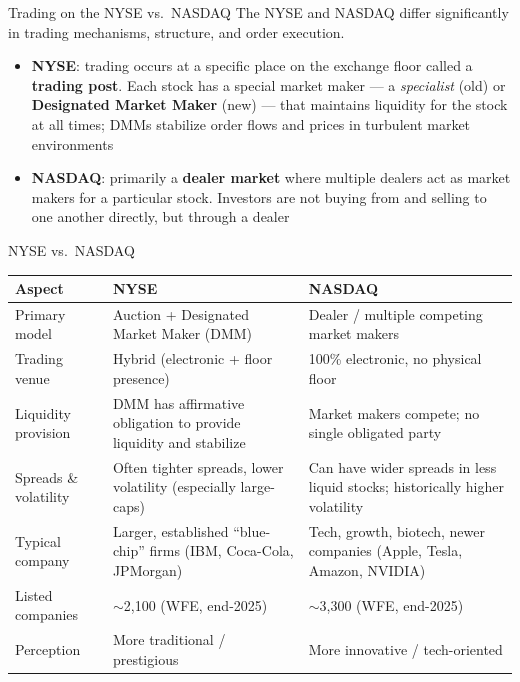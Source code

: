 \documentclass[aspectratio=169]{beamer}
\begin{document}
\begin{frame}{Trading on the NYSE vs.\ NASDAQ}
The NYSE and NASDAQ differ significantly in trading mechanisms, structure, and order execution.
\begin{itemize}
  \item \textbf{NYSE}: trading occurs at a specific place on the exchange floor called a \textbf{trading post}. Each stock has a special market maker --- a \emph{specialist} (old) or \textbf{Designated Market Maker} (new) --- that maintains liquidity for the stock at all times; DMMs stabilize order flows and prices in turbulent market environments
  \item \textbf{NASDAQ}: primarily a \textbf{dealer market} where multiple dealers act as market makers for a particular stock. Investors are not buying from and selling to one another directly, but through a dealer
\end{itemize}
\end{frame}

\begin{frame}{NYSE vs.\ NASDAQ}
\begin{table}
\centering
\footnotesize
\begin{tabular}{p{}p{}p{}}
\toprule
\textbf{Aspect} & \textbf{NYSE} & \textbf{NASDAQ} \\
\midrule
Primary model & Auction + Designated Market Maker (DMM) & Dealer / multiple competing market makers \\
Trading venue & Hybrid (electronic + floor presence) & 100\% electronic, no physical floor \\
Liquidity provision & DMM has affirmative obligation to provide liquidity and stabilize & Market makers compete; no single obligated party \\
Spreads \& volatility & Often tighter spreads, lower volatility (especially large-caps) & Can have wider spreads in less liquid stocks; historically higher volatility \\
Typical company & Larger, established ``blue-chip'' firms (IBM, Coca-Cola, JPMorgan) & Tech, growth, biotech, newer companies (Apple, Tesla, Amazon, NVIDIA) \\
Listed companies & $\sim$2,100 (WFE, end-2025) & $\sim$3,300 (WFE, end-2025) \\
Perception & More traditional / prestigious & More innovative / tech-oriented \\
\bottomrule
\end{tabular}
\end{table}
\end{frame}
\end{document}
